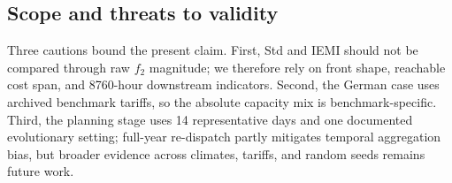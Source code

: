 \subsection{Scope and threats to validity}

Three cautions bound the present claim. First, Std and IEMI should not be compared through raw $f_2$ magnitude; we therefore rely on front shape, reachable cost span, and 8760-hour downstream indicators. Second, the German case uses archived benchmark tariffs, so the absolute capacity mix is benchmark-specific. Third, the planning stage uses 14 representative days and one documented evolutionary setting; full-year re-dispatch partly mitigates temporal aggregation bias, but broader evidence across climates, tariffs, and random seeds remains future work.

